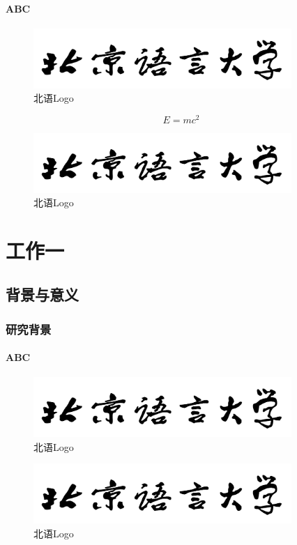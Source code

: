 \documentclass[doctor,final,oneside,continuousNum]{blcuthesis}
\begin{document}
	\subsubsection{ABC}
	\begin{figure}[h]
		\centering
		\includegraphics[width=9.8cm]{figures/BLCULogoText.png}
		\caption{北语Logo}
	\end{figure}
	\begin{equation}
		E = mc^2
	\end{equation}
	
	\begin{figure}[h]
		\centering
		\includegraphics[width=9.8cm]{figures/BLCULogoText.png}
		\caption{北语Logo}
	\end{figure}
	
	\chapter{工作一}
	\section{背景与意义}
	\subsection{研究背景}
	\subsubsection{ABC}
	\begin{figure}[h]
		\centering
		\includegraphics[width=9.8cm]{figures/BLCULogoText.png}
		\caption{北语Logo}
	\end{figure}
	
	\begin{figure}[h]
		\centering
		\includegraphics[width=9.8cm]{figures/BLCULogoText.png}
		\caption{北语Logo}
	\end{figure}
	
\end{document}
